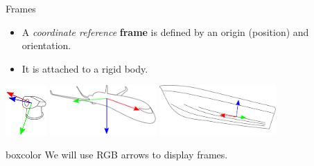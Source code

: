 \documentclass[14pt,aspectratio=169]{beamer}
\begin{document}
\begin{frame}{Frames}
\begin{itemize}
\item A \textit{coordinate reference} \textbf{frame} is defined by an origin (position) and orientation.
\item It is attached to a rigid body.
\end{itemize}

\vfill

\includegraphics[height=1.9cm]{images/conventions_camera}
\includegraphics[height=1.9cm]{images/conventions_plane}
\includegraphics[height=1.9cm]{images/conventions_ship}

\vfill

\begin{beamercolorbox}[wd=\textwidth,sep=1em]{boxcolor}
\centering
We will use RGB arrows to display frames.
\end{beamercolorbox}
\end{frame}
\end{document}
